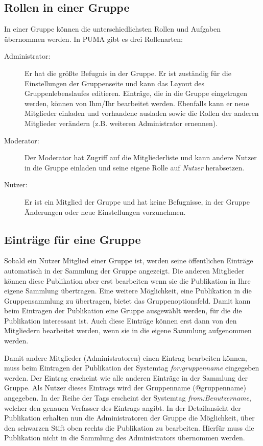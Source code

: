 \subsection{Rollen in einer Gruppe}
\label{subsec:RollenInGruppe}
In einer Gruppe können die unterschiedlichsten Rollen und Aufgaben übernommen werden. In PUMA gibt es drei Rollenarten:
\begin{description}
    \item [Administrator:] Er hat die größte Befugnis in der Gruppe. Er ist zuständig für die Einstellungen der Gruppenseite und kann das Layout des Gruppenlebenslaufes editieren. Einträge, die in die Gruppe eingetragen werden, können von Ihm/Ihr bearbeitet werden. Ebenfalls kann er neue Mitglieder einladen und vorhandene ausladen sowie die Rollen der anderen Mitglieder verändern (z.B. weiteren Administrator ernennen).
    \item [Moderator:] Der Moderator hat Zugriff auf die Mitgliederliste und kann andere Nutzer in die Gruppe einladen und seine eigene Rolle auf \textit{Nutzer} herabsetzen.
    \item [Nutzer:] Er ist ein Mitglied der Gruppe und hat keine Befugnisse, in der Gruppe Änderungen oder neue Einstellungen vorzunehmen.
\end{description}

\subsection{Einträge für eine Gruppe}
\label{subsec:gruppenfunktion}
Sobald ein Nutzer Mitglied einer Gruppe ist, werden seine öffentlichen Einträge automatisch in der Sammlung der Gruppe angezeigt. Die anderen Mitglieder können diese Publikation aber erst bearbeiten wenn sie die Publikation in Ihre eigene Sammlung übertragen. Eine weitere Möglichkeit, eine Publikation in die Gruppensammlung zu übertragen, bietet das Gruppenoptionsfeld. Damit kann beim Eintragen der Publikation eine Gruppe ausgewählt werden, für die die Publikation interessant ist. Auch diese Einträge können erst dann von den Mitgliedern bearbeitet werden, wenn sie in die eigene Sammlung aufgenommen werden.

Damit andere Mitglieder (Administratoren) einen Eintrag bearbeiten können, muss beim Eintragen der Publikation der Systemtag \textit{for:gruppenname} eingegeben werden. Der Eintrag erscheint wie alle anderen Einträge in der Sammlung der Gruppe. Als Nutzer dieses Eintrags wird der Gruppenname (@gruppenname) angegeben. In der Reihe der Tags erscheint der Systemtag \textit{from:Benutzername}, welcher den genauen Verfasser des Eintrags angibt. In der Detailansicht der Publikation erhalten nun die Administratoren der Gruppe die Möglichkeit, über den schwarzen Stift oben rechts die Publikation zu bearbeiten. Hierfür muss die Publikation nicht in die Sammlung des Administrators übernommen werden.

